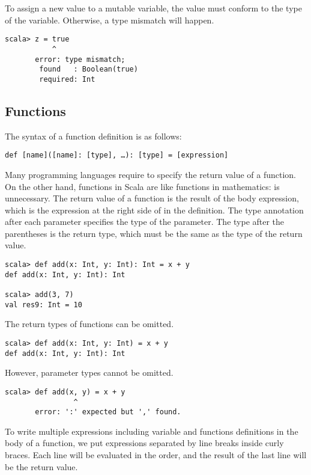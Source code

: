 To assign a new value to a mutable variable, the value must conform to the
type of the variable. Otherwise, a type mismatch will happen.

\begin{verbatim}
scala> z = true
           ^
       error: type mismatch;
        found   : Boolean(true)
        required: Int
\end{verbatim}

\subsection{Functions}

The syntax of a function definition is as follows:

\begin{verbatim}
def [name]([name]: [type], …): [type] = [expression]
\end{verbatim}

Many programming languages require  to specify the return value of a function.
On the other hand, functions in Scala are like functions in mathematics:  is unnecessary.
The return value of a function is the result of the body expression, which is the expression
at the right side of \code{=} in the definition. The type annotation after each parameter specifies
the type of the parameter. The type after the parentheses is the return type, which must be the
same as the type of the return value.

\begin{verbatim}
scala> def add(x: Int, y: Int): Int = x + y
def add(x: Int, y: Int): Int

scala> add(3, 7)
val res9: Int = 10
\end{verbatim}

The return types of functions can be omitted.

\begin{verbatim}
scala> def add(x: Int, y: Int) = x + y
def add(x: Int, y: Int): Int
\end{verbatim}

However, parameter types cannot be omitted.

\begin{verbatim}
scala> def add(x, y) = x + y
                ^
       error: ':' expected but ',' found.
\end{verbatim}

To write multiple expressions including variable and functions definitions
in the body of a function, we put expressions separated by line breaks
inside curly braces.
Each line will be evaluated in the order, and the result of the last line will
be the return value.

